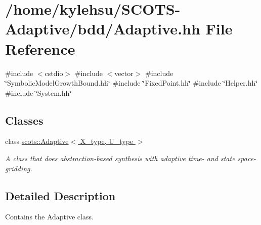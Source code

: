 \hypertarget{Adaptive_8hh}{}\section{/home/kylehsu/\+S\+C\+O\+T\+S-\/\+Adaptive/bdd/\+Adaptive.hh File Reference}
\label{Adaptive_8hh}
{\ttfamily \#include $<$cstdio$>$}\newline
{\ttfamily \#include $<$vector$>$}\newline
{\ttfamily \#include \char`\"{}Symbolic\+Model\+Growth\+Bound.\+hh\char`\"{}}\newline
{\ttfamily \#include \char`\"{}Fixed\+Point.\+hh\char`\"{}}\newline
{\ttfamily \#include \char`\"{}Helper.\+hh\char`\"{}}\newline
{\ttfamily \#include \char`\"{}System.\+hh\char`\"{}}\newline
\subsection*{Classes}
\begin{DoxyCompactItemize}
\item 
class \hyperlink{classscots_1_1Adaptive}{scots\+::\+Adaptive$<$ X\+\_\+type, U\+\_\+type $>$}
\begin{DoxyCompactList}\small\item\em A class that does abstraction-\/based synthesis with adaptive time-\/ and state space-\/gridding. \end{DoxyCompactList}\end{DoxyCompactItemize}


\subsection{Detailed Description}
Contains the Adaptive class. 